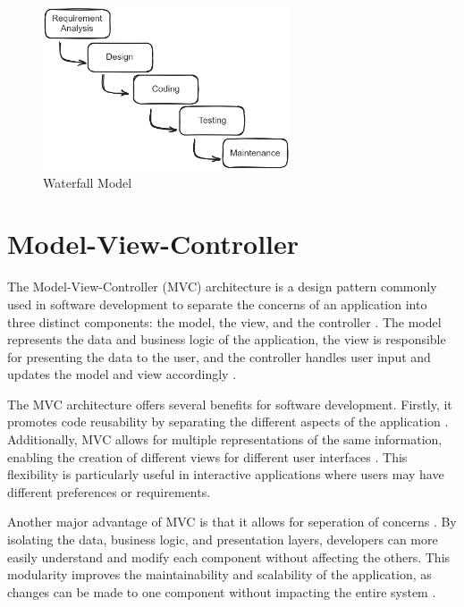 \begin{figure}[!ht]
    \centering
    \includegraphics[width=0.65\textwidth]{texs/Part2/chapter1/image/waterfall.png}
    \caption{Waterfall Model}
    \label{fig:waterfall-model}
\end{figure}


\section{Model-View-Controller}
\label{sec:model-view-controller}

The Model-View-Controller (MVC) architecture is a design pattern commonly used in software development to separate the concerns of an application into three distinct components: the model, the view, and the controller \cite[47]{Garca2023}. The model represents the data and business logic of the application, the view is responsible for presenting the data to the user, and the controller handles user input and updates the model and view accordingly \cite{sarker14}.

The MVC architecture offers several benefits for software development. Firstly, it promotes code reusability by separating the different aspects of the application \cite{sarker14}. Additionally, MVC allows for multiple representations of the same information, enabling the creation of different views for different user interfaces \cite{sarker14}. This flexibility is particularly useful in interactive applications where users may have different preferences or requirements.

Another major advantage of MVC is that it allows for seperation of concerns \cite{Stepien}. By isolating the data, business logic, and presentation layers, developers can more easily understand and modify each component without affecting the others. This modularity improves the maintainability and scalability of the application, as changes can be made to one component without impacting the entire system \cite{Kozon_2023}.

